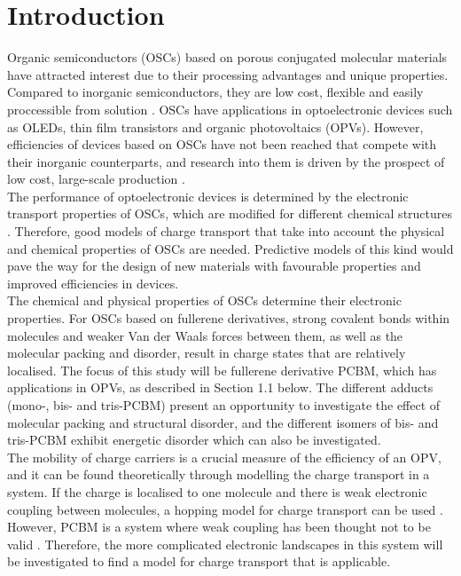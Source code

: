 \documentclass[a4paper,12pt]{article}
\begin{document}
\newpage
\tableofcontents
\newpage

\section{Introduction}

\noindent Organic semiconductors (OSCs) based on porous conjugated molecular materials have attracted interest due to their processing advantages and unique properties. Compared to inorganic semiconductors, they are low cost, flexible and easily proccessible from solution \cite{Kwiatkowski2008}. OSCs have applications in optoelectronic devices such as OLEDs, thin film transistors and organic photovoltaics (OPVs). However, efficiencies of devices based on OSCs have not been reached that compete with their inorganic counterparts, and research into them is driven by the prospect of low cost, large-scale production \cite{Hoppe2011}. \\ 

\noindent The performance of optoelectronic devices is determined by the electronic transport properties of OSCs, which are modified for different chemical structures \cite{He2010} \cite{Lenes2009} \cite{Liu2013}. Therefore, good models of charge transport that take into account the physical and chemical properties of OSCs are needed. Predictive models of this kind would pave the way for the design of new materials with favourable properties and improved efficiencies in devices. \\ 

 \noindent The chemical and physical properties of OSCs determine their electronic properties. For OSCs based on fullerene derivatives, strong covalent bonds within molecules and weaker Van der Waals forces between them, as well as the molecular packing and disorder, result in charge states that are relatively localised. The focus of this study will be fullerene derivative PCBM, which has applications in OPVs, as described in Section 1.1 below. The different adducts (mono-, bis- and tris-PCBM) present an opportunity to investigate the effect of molecular packing and structural disorder, and the different isomers of bis- and tris-PCBM exhibit energetic disorder which can also be investigated.\\ 

\noindent The mobility of charge carriers is a crucial measure of the efficiency of an OPV, and it can be found theoretically through modelling the charge transport in a system.  If the charge is localised to one molecule and there is weak electronic coupling between molecules, a hopping model for charge transport can be used \cite{Nelson2009} \cite{Frost2006} \cite{Fishchuk2003}. However, PCBM is a system where weak coupling has been thought not to be valid \cite{Cheung2010} \cite{Oberhofer2012} \cite{Gajdos2013}. Therefore, the more complicated electronic landscapes in this system will be investigated to find a model for charge transport that is applicable. \\
\end{document}
